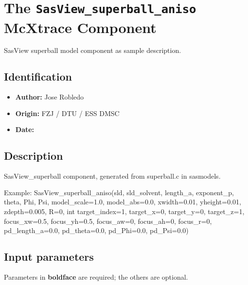 \section{The \texttt{SasView\_superball\_aniso} McXtrace Component}
SasView superball model component as sample description.

\subsection*{Identification}
\begin{itemize}
  \item \textbf{Author:} Jose Robledo
  \item \textbf{Origin:} FZJ / DTU / ESS DMSC
  \item \textbf{Date:} 
\end{itemize}

\subsection*{Description}
SasView\_superball component, generated from superball.c in sasmodels.

Example: SasView\_superball\_aniso(sld, sld\_solvent, length\_a, exponent\_p, theta, Phi, Psi, model\_scale=1.0, model\_abs=0.0, xwidth=0.01, yheight=0.01, zdepth=0.005, R=0, int target\_index=1, target\_x=0, target\_y=0, target\_z=1, focus\_xw=0.5, focus\_yh=0.5, focus\_aw=0, focus\_ah=0, focus\_r=0, pd\_length\_a=0.0, pd\_theta=0.0, pd\_Phi=0.0, pd\_Psi=0.0)

\subsection*{Input parameters}
Parameters in \textbf{boldface} are required; the others are optional.

